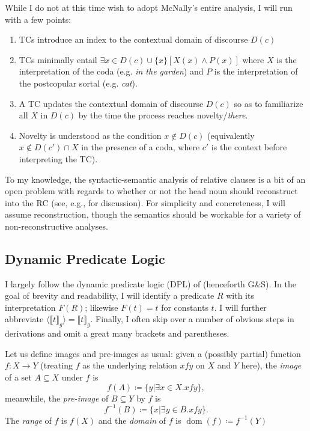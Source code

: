 \documentclass[11pt]{article}
\DeclareMathOperator{\dom}{dom}
\begin{document}
While I do not at this time wish to adopt McNally's entire analysis, I will run with a few points:
\begin{enumerate}[label=(\roman*)]
	\item TCs introduce an index to the contextual domain of discourse \(D(c)\)
	\item TCs minimally entail \(\exists x \in D(c) \cup \{x\} [X(x) \land P(x)]\) where \(X\) is the interpretation of the coda (e.g. \textit{in the garden}) and \(P\) is the interpretation of the postcopular sortal (e.g. \textit{cat}).
	\item A TC updates the contextual domain of discourse \(D(c)\) so as to familiarize all \(X\) in \(D(c)\) by the time the process reaches novelty/\textit{there}.
	\item Novelty is understood as the condition \(x \not\in D(c)\) (equivalently \(x \not\in D(c') \cap X\) in the presence of a coda, where \(c'\) is the context before interpreting the TC).
\end{enumerate}

To my knowledge, the syntactic-semantic analysis of relative clauses is a bit of an open problem with regards to whether or not the head noun should reconstruct into the RC (see, e.g., \cite{bhattRaisingAnalysisRelative2002, cinqueSyntaxRelativeClauses2020} for discussion). For simplicity and concreteness, I will assume reconstruction, though the semantics should be workable for a variety of non-reconstructive analyses.


\subsection{Dynamic Predicate Logic}
I largely follow the dynamic predicate logic (DPL) of \citet{groenendijkDynamicPredicateLogic1991} (henceforth G\&S). In the goal of brevity and readability, I will identify a predicate \(R\) with its interpretation \(F(R)\); likewise \(F(t) = t\) for constants \(t\). I will further abbreviate \(\langle \llbracket t \rrbracket_g \rangle = \llbracket t \rrbracket_g\). Finally, I often skip over a number of obvious steps in derivations and omit a great many brackets and parentheses.

Let us define images and pre-images as usual: given a (possibly partial) function \(f : X \to Y\) (treating \(f\) as the underlying relation \(xfy\) on \(X\) and \(Y\) here), the \textit{image} of a set \(A \subseteq X\) under \(f\) is
\[f(A) \coloneqq \{y | \exists x \in X . xfy\},\]
meanwhile, the \textit{pre-image} of \(B \subseteq Y\) by \(f\) is
\[f^{-1}(B) \coloneqq \{x | \exists y \in B . xfy\}.\]
The \textit{range} of \(f\) is \(f(X)\) and the \textit{domain} of \(f\) is \(\dom(f) \coloneqq f^{-1}(Y)\)
\end{document}
